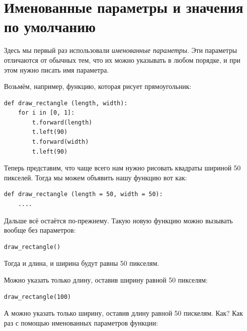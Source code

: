 \section*{Именованные параметры и значения по умолчанию}

Здесь мы первый раз использовали \emph{именованные параметры}. Эти параметры отличаются от обычных тем, что их можно указывать в любом порядке, и при этом нужно писать имя параметра.

Возьмём, например, функцию, которая рисует прямоугольник:

\begin{listing}
\begin{verbatim}
def draw_rectangle (length, width):
    for i in [0, 1]:
        t.forward(length)
        t.left(90)
        t.forward(width)
        t.left(90)
\end{verbatim}
\end{listing}

Теперь представим, что чаще всего нам нужно рисовать квадраты шириной 50 пикселей. Тогда мы можем объявить нашу функцию вот как:

\begin{listing}
\begin{verbatim}
def draw_rectangle (length = 50, width = 50):
	....
\end{verbatim}
\end{listing}

Дальше всё остаётся по-прежнему. Такую новую функцию можно вызывать вообще без параметров:

\begin{listing}
\begin{verbatim}
draw_rectangle()
\end{verbatim}
\end{listing}

Тогда и длина, и ширина будут равны 50 пикселям.

Можно указать только длину, оставив ширину равной 50 пикселям:

\begin{listing}
\begin{verbatim}
draw_rectangle(100)
\end{verbatim}
\end{listing}

А можно указать только ширину, оставив длину равной 50 пискелям. Как? Как раз с помощью именованных параметров функции:

